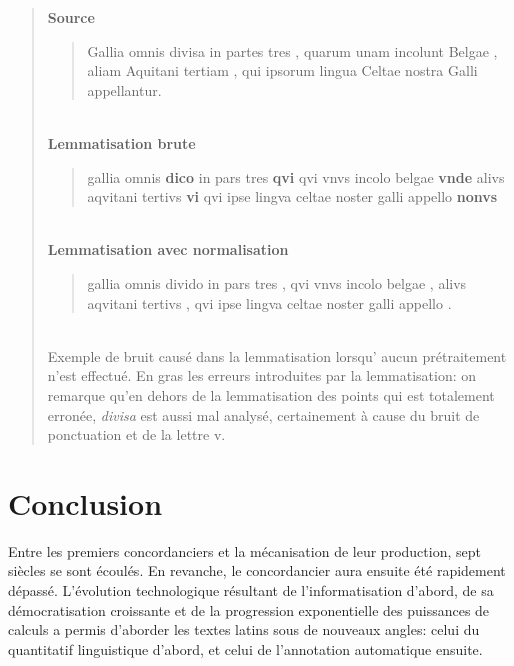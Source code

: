 \begin{quote}
    \textbf{Source}\\
    \blockquote{Gallia omnis divisa in partes tres , quarum unam incolunt Belgae , aliam Aquitani tertiam , qui ipsorum lingua Celtae nostra Galli appellantur.}\\
    \textbf{Lemmatisation brute}\\
    \blockquote{gallia omnis \textbf{dico} in pars tres \textbf{qvi} qvi vnvs incolo belgae \textbf{vnde} alivs aqvitani tertivs \textbf{vi} qvi ipse lingva celtae noster galli appello \textbf{nonvs}}\\
    \textbf{Lemmatisation avec normalisation}\\
    \blockquote{gallia omnis divido in pars tres , qvi vnvs incolo belgae , alivs aqvitani tertivs , qvi ipse lingva celtae noster galli appello .}\\
    
    Exemple de bruit causé dans la lemmatisation lorsqu’ aucun prétraitement n'est effectué. En gras les erreurs introduites par la lemmatisation: on remarque qu'en dehors de la lemmatisation des points qui est totalement erronée, \textit{divisa} est aussi mal analysé, certainement à cause du bruit de ponctuation et de la lettre v.
    \label{quote:lemmatisation:gallia-errors}
\end{quote}


 
\clearpage
\section*{Conclusion}

Entre les premiers concordanciers et la mécanisation de leur production, sept siècles se sont écoulés. En revanche, le concordancier aura ensuite été rapidement dépassé. L'évolution technologique résultant de l'informatisation d'abord, de sa démocratisation croissante et de la progression exponentielle des puissances de calculs a permis d'aborder les textes latins sous de nouveaux angles: celui du quantitatif linguistique d'abord, et celui de l'annotation automatique ensuite.

